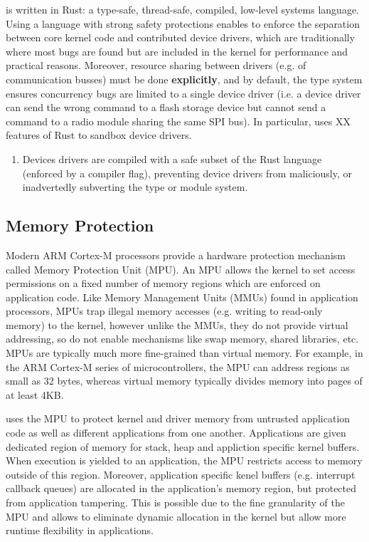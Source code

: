 \name is written in Rust: a type-safe, thread-safe, compiled, low-level systems
language. Using a language with strong safety protections enables \name to
enforce the separation between core kernel code and contributed device
drivers, which are traditionally where most bugs are found but are included in
the kernel for performance and practical reasons. Moreover, resource sharing
between drivers (e.g. of communication busses) must be done {\bf explicitly}, and
by default, the type system ensures concurrency bugs are limited to a single
device driver (i.e. a device driver can send the wrong command to a flash
storage device but cannot send a command to a radio module sharing the same SPI
bus). In particular, \name uses XX features of Rust to sandbox device drivers.

\begin{enumerate}
  \item Devices drivers are compiled with a safe subset of the Rust language
  (enforced by a compiler flag), preventing device drivers from maliciously, or
  inadvertedly subverting the type or module system.

\end{enumerate} 

\subsection{Memory Protection}

Modern ARM Cortex-M processors provide a hardware protection mechanism called
Memory Protection Unit (MPU).  An MPU allows the kernel to set access
permissions on a fixed number of memory regions which are enforced on
application code. Like Memory Management Units (MMUs) found in application
processors, MPUs trap illegal memory accesses (e.g. writing to read-only memory)
to the kernel, however unlike the MMUs, they do not provide virtual addressing,
so do not enable mechanisms like swap memory, shared libraries, etc. MPUs are
typically much more fine-grained than virtual memory. For example, in the ARM
Cortex-M series of microcontrollers, the MPU can address regions as small as 32
bytes, whereas virtual memory typically divides memory into pages of at least
4KB.

\name uses the MPU to protect kernel and driver memory from untrusted
application code as well as different applications from one another.
Applications are given dedicated region of memory for stack, heap and appliction
specific kernel buffers. When execution is yielded to an application, the MPU
restricts access to memory outside of this region. Moreover, application
specific kenel buffers (e.g. interrupt callback queues) are allocated in the
application's memory region, but protected from application tampering. This is
possible due to the fine granularity of the MPU and allows \name to eliminate
dynamic allocation in the kernel but allow more runtime flexibility in
applications.

